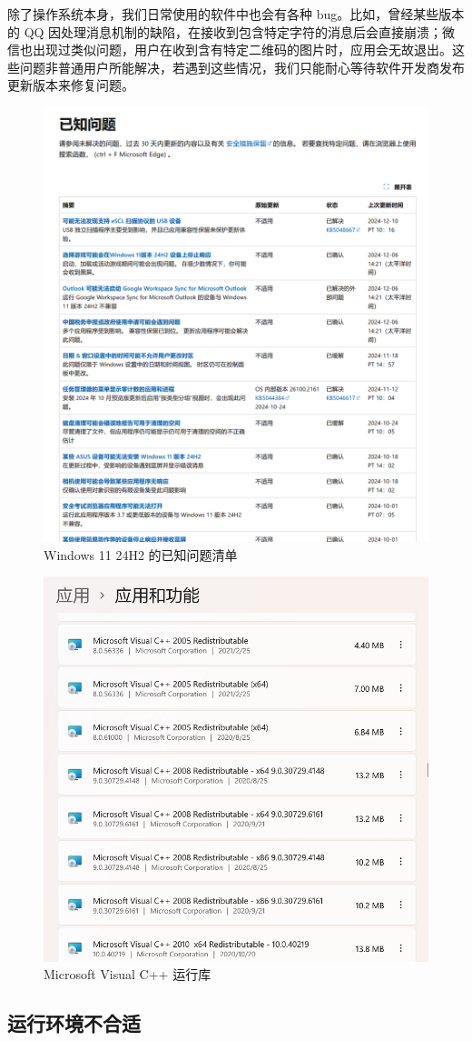 除了操作系统本身，我们日常使用的软件中也会有各种 bug。比如，曾经某些版本的 QQ 因处理消息机制的缺陷，在接收到包含特定字符的消息后会直接崩溃；微信也出现过类似问题，用户在收到含有特定二维码的图片时，应用会无故退出。这些问题非普通用户所能解决，若遇到这些情况，我们只能耐心等待软件开发商发布更新版本来修复问题。

\begin{figure}[htb!]
  \centering
  \includegraphics[width=.6\textwidth]{assets/basic/Windows_bugs.png}
  \caption{Windows 11 24H2 的已知问题清单}
  \label{fig:Windows_bugs}
\end{figure}

\begin{figure}[htb!]
  \centering
  \includegraphics[width=.6\textwidth]{assets/basic/MS_CPP_redises.png}
  \caption{Microsoft Visual C++ 运行库}
  \label{fig:MS_CPP_redises}
\end{figure}

\subsection{运行环境不合适}

